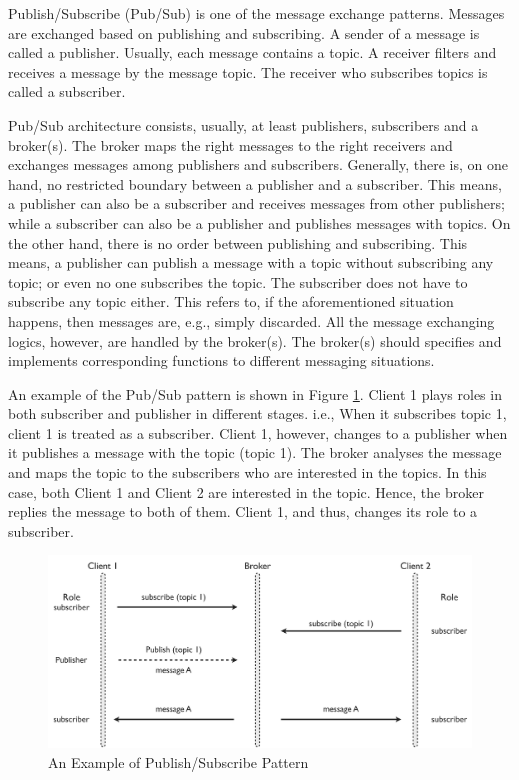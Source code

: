 Publish/Subscribe (Pub/Sub) is one of the message exchange patterns. Messages are exchanged based on publishing and subscribing. A sender of a message is called a publisher. Usually, each message contains a topic. A receiver filters and receives a message by the message topic. The receiver who subscribes topics is called a subscriber. 

Pub/Sub architecture consists, usually, at least publishers, subscribers and a broker(s). The broker maps the right messages to the right receivers and exchanges messages among publishers and subscribers. Generally, there is, on one hand, no restricted boundary between a publisher and a subscriber. This means, a publisher can also be a subscriber and receives messages from other publishers; while a subscriber can also be a publisher and publishes messages with topics. On the other hand, there is no order between publishing and subscribing. This means, a publisher can publish a message with a topic without subscribing any topic; or even no one subscribes the topic. The subscriber does not have to subscribe any topic either. This refers to, if the aforementioned situation happens, then messages are, e.g., simply discarded. All the message exchanging logics, however, are handled by the broker(s). The broker(s) should specifies and implements corresponding functions to different messaging situations. 

An example of the Pub/Sub pattern is shown in Figure \ref{fig:publish-subscribe-pattern}. Client 1 plays roles in both subscriber and publisher in different stages. i.e., When it subscribes topic 1, client 1 is treated as a subscriber. Client 1, however, changes to a publisher when it publishes a message with the topic (topic 1). The broker analyses the message and maps the topic to the subscribers who are interested in the topics. In this case, both Client 1 and Client 2 are interested in the topic. Hence, the broker replies the message to both of them. Client 1, and thus, changes its role to a subscriber.

\begin{figure}[t]
  \begin{center}
    \includegraphics[width=1\textwidth]{images/publish-subscribe-pattern.pdf}
    \caption{An Example of Publish/Subscribe Pattern}
    \label{fig:publish-subscribe-pattern}
  \end{center}
\end{figure}

